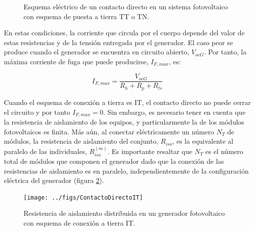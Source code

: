 %
\begin{figure}
\hfill{}\hfill{}\hfill{}\hfill{}

\caption{\label{fig:ContactoDirectoTT_TN}Esquema eléctrico de un contacto
directo en un sistema fotovoltaico con esquema de puesta a tierra
TT o TN.}

\end{figure}


En estas condiciones, la corriente que circula por el cuerpo depende
del valor de estas resistencias y de la tensión entregada por el generador.
El caso peor se produce cuando el generador se encuentra en circuito
abierto, $V_{ocG}$. Por tanto, la máxima corriente de fuga que puede
producirse, $I_{F,max}$,
es:

\begin{equation}
I_{F,max}=\frac{V_{ocG}}{R_{h}+R_{p}+R_{ts}}\label{eq:IfmaxTT}\end{equation}


Cuando el esquema de conexión a tierra es IT, el contacto directo
no puede cerrar el circuito y por tanto $I_{F,max}=0$. Sin embargo,
es necesario tener en cuenta que la resistencia de aislamiento de
los equipos, y particularmente la de los módulos fotovoltaicos es
finita. Más aún, al conectar eléctricamente un número $N_{T}$
de módulos, la resistencia de aislamiento del conjunto, $R_{iso}$,
es la equivalente al paralelo de las individuales, $R_{iso}^{(m)}$.
Es importante resaltar que $N_{T}$ es el número total de módulos
que componen el generador dado que la conexión de las resistencias
de aislamiento es en paralelo, independientemente de la configuración
eléctrica del generador (figura \ref{fig:RisoDistribuidaIT}). 

%
\begin{figure}
\texttt{[image: ../figs/ContactoDirectoIT]}

\caption{\label{fig:RisoDistribuidaIT}Resistencia de aislamiento distribuida
en un generador fotovoltaico con esquema de conexión a tierra IT.}

\end{figure}


